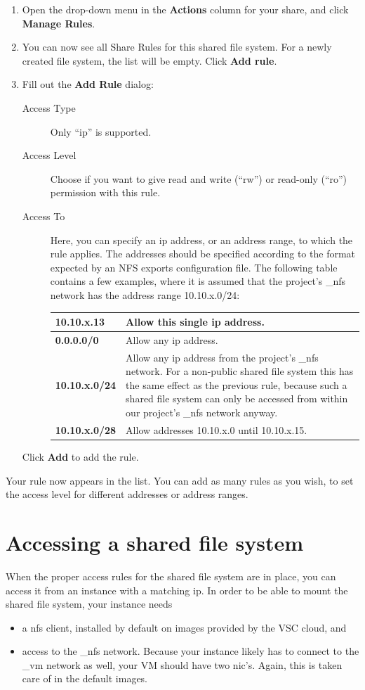 \begin{enumerate}
\item Open the drop-down menu in the \textbf{Actions} column for your share, and click \textbf{Manage Rules}.
\item You can now see all Share Rules for this shared file system.
  For a newly created file system, the list will be empty.  Click \textbf{Add rule}.
\item Fill out the \textbf{Add Rule} dialog:
  \begin{description}
  \item[Access Type] Only ``ip'' is supported.
  \item[Access Level] Choose if you want to give read and write
    (``rw'') or read-only (``ro'') permission with this rule.
  \item[Access To] Here, you can specify an ip address, or an address
    range, to which the rule applies.  The addresses should be
    specified according to the format expected by an NFS exports
    configuration file.  The following table contains a few examples,
    where it is assumed that the project's \_nfs network has the
    address range 10.10.x.0/24:

    \begin{tabular}{>{\bfseries}lp{}}
      10.10.x.13 & Allow this single ip address.
      \\ \hline
      0.0.0.0/0 & Allow any ip address.
      \\ \hline
      10.10.x.0/24 & Allow any ip address from the project's \_nfs network.  For a non-public shared file system this has the same effect as the previous rule, because such a shared file system can only be accessed from within our project's \_nfs network anyway.
      \\ \hline 
      10.10.x.0/28 & Allow addresses 10.10.x.0 until 10.10.x.15.
      \\
    \end{tabular}

  \end{description}
  Click \textbf{Add} to add the rule.
\end{enumerate}
Your rule now appears in the list.  You can add as many rules as you
wish, to set the access level for different addresses or address
ranges.

\section*{Accessing a shared file system}\label{sec:access-shar-file}
When the proper access rules for the shared file system are in place,
you can access it from an instance with a matching ip.  In order to be
able to mount the shared file system, your instance needs
\begin{itemize}
\item a \gls{nfs} client, installed by default on images provided by
  the VSC cloud, and
\item access to the \_nfs network.  Because your instance likely has to
  connect to the \_vm network as well, your VM should have two
  \gls{nic}'s.  Again, this is taken care of in the default images.
\end{itemize}

